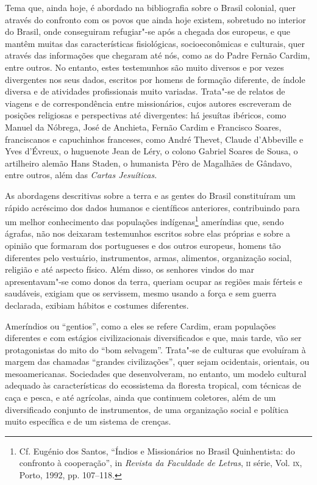 Tema que, ainda hoje, é abordado na bibliografia sobre o Brasil
colonial, quer através do confronto com os povos que ainda hoje existem,
sobretudo no interior do Brasil, onde conseguiram refugiar"-se após a
chegada dos europeus, e que mantêm muitas das características
fisiológicas, socioeconômicas e culturais, quer através das informações
que chegaram até nós, como as do Padre Fernão Cardim, entre outros. No
entanto, estes testemunhos são muito diversos e por vezes divergentes
nos seus dados, escritos por homens de formação diferente, de índole
diversa e de atividades profissionais muito variadas. Trata"-se de
relatos de viagens e de correspondência entre missionários, cujos
autores escreveram de posições religiosas e perspectivas até
divergentes: há jesuítas ibéricos, como Manuel da Nóbrega, José de
Anchieta, Fernão Cardim e Francisco Soares, franciscanos e capuchinhos
franceses, como André Thevet, Claude d'Abbeville e Yves d'Évreux, o
huguenote Jean de Léry, o colono Gabriel Soares de Sousa, o artilheiro
alemão Hans Staden, o humanista Pêro de Magalhães de Gândavo, entre outros,
além das \textit{Cartas Jesuíticas.}

As abordagens descritivas sobre a terra e as gentes do Brasil
constituíram um rápido acréscimo dos dados humanos e científicos
anteriores, contribuindo para um melhor conhecimento das populações
indígenas\footnote{ Cf. Eugénio dos Santos, ``Índios e
Missionários no Brasil Quinhentista: do confronto à cooperação'', in
\textit{Revista da Faculdade de Letras}, \textsc{ii} série, Vol. \textsc{ix}, Porto,
1992, pp. 107--118.} ameríndias que, sendo ágrafas, não nos deixaram
testemunhos escritos sobre elas próprias e sobre a opinião que formaram
dos portugueses e dos outros europeus, homens tão diferentes pelo
vestuário, instrumentos, armas, alimentos, organização social, religião
e até aspecto físico. Além disso, os senhores vindos do mar
apresentavam"-se como donos da terra, queriam ocupar as regiões mais
férteis e saudáveis, exigiam que os servissem, mesmo usando a força e
sem guerra declarada, exibiam hábitos e costumes diferentes.

Ameríndios ou ``gentios'', como a eles se refere Cardim, eram
populações diferentes e com estágios civilizacionais diversificados e
que, mais tarde, vão ser protagonistas do mito do ``bom selvagem''.
Trata"-se de culturas que evoluíram à margem das chamadas ``grandes
civilizações'', quer sejam ocidentais, orientais, ou mesoamericanas.
Sociedades que desenvolveram, no entanto, um modelo cultural adequado
às características do ecossistema da floresta tropical, com técnicas 
de caça e pesca, e até agrícolas, ainda que continuem coletores, 
além de um diversificado conjunto de instrumentos, de uma
organização social e política muito específica e de um sistema de crenças.

